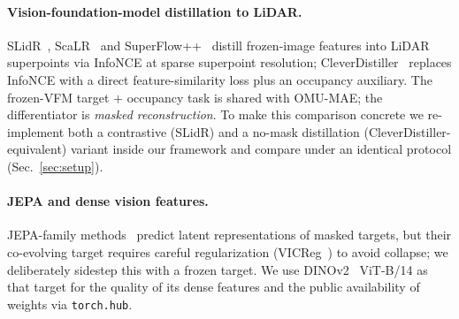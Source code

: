\paragraph{Vision-foundation-model distillation to LiDAR.}
SLidR~\cite{slidr}, ScaLR~\cite{scalr} and SuperFlow++~\cite{superflow}
distill frozen-image features into LiDAR superpoints via InfoNCE at sparse
superpoint resolution; CleverDistiller~\cite{cleverdistiller} replaces
InfoNCE with a direct feature-similarity loss plus an occupancy auxiliary.
The frozen-VFM target $+$ occupancy task is shared with OMU-MAE; the
differentiator is \emph{masked reconstruction}. To make this comparison
concrete we re-implement both a contrastive (SLidR) and a no-mask
distillation (CleverDistiller-equivalent) variant inside our framework and
compare under an identical protocol (Sec.~\ref{sec:setup}).

\paragraph{JEPA and dense vision features.}
JEPA-family methods~\cite{ijepa,vjepa,lejepa,adljepa} predict latent
representations of masked targets, but their co-evolving target requires
careful regularization (VICReg~\cite{vicreg}) to avoid collapse; we
deliberately sidestep this with a frozen target. We use
DINOv2~\cite{dino,dinov2,dinov3} ViT-B/14 as that target for the quality of
its dense features and the public availability of weights via
\texttt{torch.hub}.
